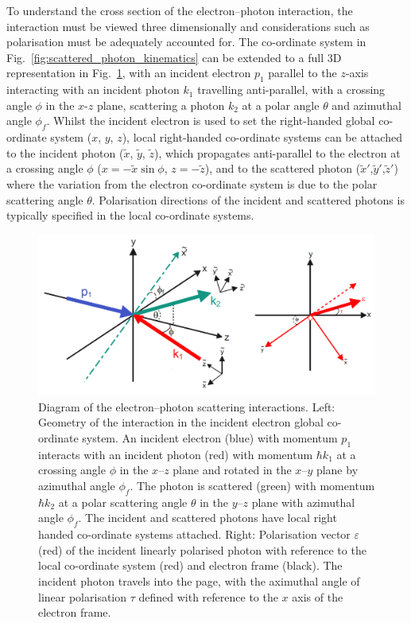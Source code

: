 \documentclass[../main.tex]{subfiles}
\begin{document}
To understand the cross section of the electron--photon interaction, the interaction must be viewed three dimensionally and considerations such as polarisation must be adequately accounted for. The co-ordinate system in Fig.~\ref{fig:scattered_photon_kinematics} can be extended to a full 3D representation in Fig.~\ref{fig:3D_coord_system}, with an incident electron $p_{1}$ parallel to the $z$-axis interacting with an incident photon $k_{1}$ travelling anti-parallel, with a crossing angle $\phi$ in the $x$-$z$ plane, scattering a photon $k_{2}$ at a polar angle $\theta$ and azimuthal angle $\phi_{f}$. Whilst the incident electron is used to set the right-handed global co-ordinate system ($x$, $y$, $z$), local right-handed co-ordinate systems can be attached to the incident photon ($\tilde{x}$, $\tilde{y}$, $\tilde{z}$), which propagates anti-parallel to the electron at a crossing angle $\phi$ ($x = -\tilde{x}\sin\phi$, $z = -\tilde{z}$), and to the scattered photon ($\tilde{x}'$,$\tilde{y}'$,$\tilde{z}'$) where the variation from the electron co-ordinate system is due to the polar scattering angle $\theta$. Polarisation directions of the incident and scattered photons is typically specified in the local co-ordinate systems.  
\begin{figure}[!h]
\centering
\includegraphics[width=\textwidth]{Figures/Photon_Production_by_Inverse_Compton_Scattering/ICS_interaction_polarisation.pdf}
\caption{Diagram of the electron--photon scattering interactions. Left: Geometry of the interaction in the incident electron global co-ordinate system. An incident electron (blue) with momentum $p_{1}$ interacts with an incident photon (red) with momentum $\hbar k_{1}$ at a crossing angle $\phi$ in the $x$--$z$ plane and rotated in the $x$--$y$ plane by azimuthal angle $\phi_{f}$. The photon is scattered (green) with momentum $\hbar k_{2}$ at a polar scattering angle $\theta$ in the $y$--$z$ plane with azimuthal angle $\phi_{f}$. The incident and scattered photons have local right handed co-ordinate systems attached.  Right: Polarisation vector $\varepsilon$ (red) of the incident linearly polarised photon with reference to the local co-ordinate system (red) and electron frame (black). The incident photon travels into the page, with the aximuthal angle of linear polarisation $\tau$ defined with reference to the $x$ axis of the electron frame.}
\label{fig:3D_coord_system}
\end{figure}
\end{document}
